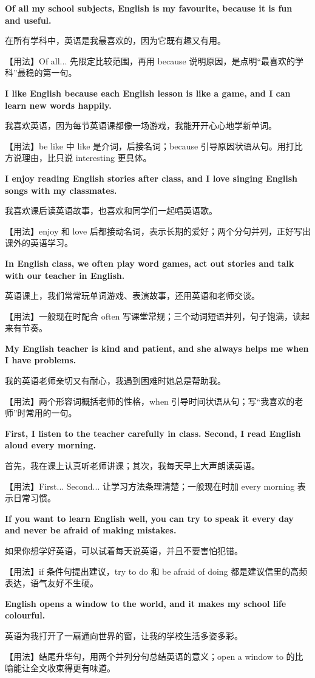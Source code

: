 \documentclass[UTF8,a4paper,11pt,oneside]{ctexbook}
\newcommand{\fansection}[1]{%
  \par\addvspace{2.4ex}%
  \Needspace{6\baselineskip}%
  \noindent{\sffamily\Large\bfseries\color{mainblue}#1}\par
  \nopagebreak
  \addvspace{0.2ex}%
  \noindent{\color{rulelight}\rule{\linewidth}{0.9pt}}\par
  \addvspace{0.9ex}%
  \nobreak
}
\newcommand{\fanpat}[3]{%
  \item{\bfseries #1}\par\nopagebreak
  {\small\color{textgray}#2}\par\nopagebreak
  {\footnotesize\color{accent!90!black}【用法】#3}\par
}
\begin{document}
\fansection{〇、本单元写作常用句型}
\begin{fanpatterns}
\fanpat{Of all my school subjects, English is my favourite, because it is fun and useful.}{在所有学科中，英语是我最喜欢的，因为它既有趣又有用。}{Of all... 先限定比较范围，再用 because 说明原因，是点明“最喜欢的学科”最稳的第一句。}

\fanpat{I like English because each English lesson is like a game, and I can learn new words happily.}{我喜欢英语，因为每节英语课都像一场游戏，我能开开心心地学新单词。}{be like 中 like 是介词，后接名词；because 引导原因状语从句。用打比方说理由，比只说 interesting 更具体。}

\fanpat{I enjoy reading English stories after class, and I love singing English songs with my classmates.}{我喜欢课后读英语故事，也喜欢和同学们一起唱英语歌。}{enjoy 和 love 后都接动名词，表示长期的爱好；两个分句并列，正好写出课外的英语学习。}

\fanpat{In English class, we often play word games, act out stories and talk with our teacher in English.}{英语课上，我们常常玩单词游戏、表演故事，还用英语和老师交谈。}{一般现在时配合 often 写课堂常规；三个动词短语并列，句子饱满，读起来有节奏。}

\fanpat{My English teacher is kind and patient, and she always helps me when I have problems.}{我的英语老师亲切又有耐心，我遇到困难时她总是帮助我。}{两个形容词概括老师的性格，when 引导时间状语从句；写“我喜欢的老师”时常用的一句。}

\fanpat{First, I listen to the teacher carefully in class. Second, I read English aloud every morning.}{首先，我在课上认真听老师讲课；其次，我每天早上大声朗读英语。}{First... Second... 让学习方法条理清楚；一般现在时加 every morning 表示日常习惯。}

\fanpat{If you want to learn English well, you can try to speak it every day and never be afraid of making mistakes.}{如果你想学好英语，可以试着每天说英语，并且不要害怕犯错。}{if 条件句提出建议，try to do 和 be afraid of doing 都是建议信里的高频表达，语气友好不生硬。}

\fanpat{English opens a window to the world, and it makes my school life colourful.}{英语为我打开了一扇通向世界的窗，让我的学校生活多姿多彩。}{结尾升华句，用两个并列分句总结英语的意义；open a window to 的比喻能让全文收束得更有味道。}

\end{fanpatterns}

\fansection{一、满分范文}
\end{document}
